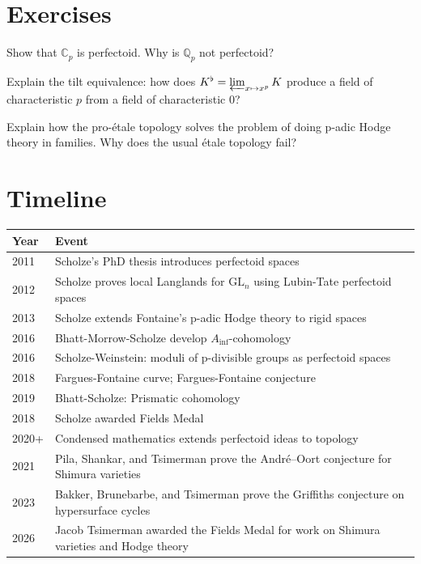 \section{Exercises}

\begin{exercise}[Basic]
Show that $\mathbb{C}_p$ is perfectoid. Why is $\mathbb{Q}_p$ not perfectoid?
\end{exercise}

\begin{exercise}[Intermediate]
Explain the tilt equivalence: how does $K^\flat = \varprojlim_{x \mapsto x^p} K$ produce a field of characteristic $p$ from a field of characteristic $0$?
\end{exercise}

\begin{exercise}[Challenge]
Explain how the pro-\'etale topology solves the problem of doing p-adic Hodge theory in families. Why does the usual \'etale topology fail?
\end{exercise}

\section{Timeline}

\begin{tabularx}{\linewidth}{lX}
\toprule
\textbf{Year} & \textbf{Event} \\ \midrule
2011 & Scholze's PhD thesis introduces perfectoid spaces \\ 
2012 & Scholze proves local Langlands for $\text{GL}_n$ using Lubin-Tate perfectoid spaces \\

2013 & Scholze extends Fontaine's p-adic Hodge theory to rigid spaces \\
2016 & Bhatt-Morrow-Scholze develop $A_{\text{inf}}$-cohomology \\

2016 & Scholze-Weinstein: moduli of p-divisible groups as perfectoid spaces \\

2018 & Fargues-Fontaine curve; Fargues-Fontaine conjecture \\

2019 & Bhatt-Scholze: Prismatic cohomology \\

2018 & Scholze awarded Fields Medal \\

2020+ & Condensed mathematics extends perfectoid ideas to topology \\
2021 & Pila, Shankar, and Tsimerman prove the Andr\'e--Oort conjecture for Shimura varieties \\
2023 & Bakker, Brunebarbe, and Tsimerman prove the Griffiths conjecture on hypersurface cycles \\
2026 & Jacob Tsimerman awarded the Fields Medal for work on Shimura varieties and Hodge theory \\
\bottomrule
\end{tabularx}


